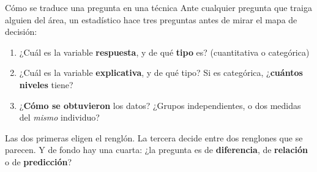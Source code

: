 \begin{frame}{Cómo se traduce una pregunta en una técnica}
  Ante cualquier pregunta que traiga alguien del área, un estadístico hace tres
  preguntas antes de mirar el mapa de decisión:

  \vspace{0.3cm}
  \begin{enumerate}
    \item ¿Cuál es la variable \textbf{respuesta}, y de qué \textbf{tipo} es?
      {\small (cuantitativa o categórica)}
      \vspace{0.15cm}
    \item ¿Cuál es la variable \textbf{explicativa}, y de qué tipo? Si es
      categórica, ¿\textbf{cuántos niveles} tiene?
      \vspace{0.15cm}
    \item ¿\textbf{Cómo se obtuvieron} los datos? ¿Grupos independientes, o dos
      medidas del \emph{mismo} individuo?
  \end{enumerate}

  \vspace{0.35cm}
  Las dos primeras eligen el renglón. La tercera decide entre dos renglones que se
  parecen. Y de fondo hay una cuarta: ¿la pregunta es de \textbf{diferencia}, de
  \textbf{relación} o de \textbf{predicción}?

  \vspace{0.3cm}
\end{frame}
